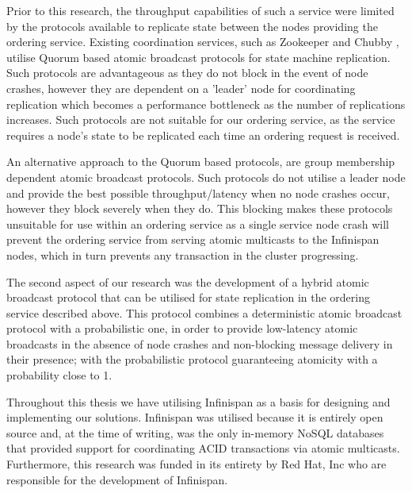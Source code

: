     Prior to this research, the throughput capabilities of such a service were limited by the protocols available to replicate state between the nodes providing the ordering service.  Existing coordination services, such as Zookeeper \citep{Hunt:2010:ZWC:1855840.1855851} and Chubby \citep{Burrows:2006:CLS:1298455.1298487}, utilise Quorum based atomic broadcast protocols for state machine replication.  Such protocols are advantageous as they do not block in the event of node crashes, however they are dependent on a 'leader' node for coordinating replication which becomes a performance bottleneck as the number of replications increases.  Such protocols are not suitable for our ordering service, as the service requires a node's state to be replicated each time an ordering request is received.  
    
    An alternative approach to the Quorum based protocols, are group membership dependent atomic broadcast protocols.  Such protocols do not utilise a leader node and provide the best possible throughput/latency when no node crashes occur, however they block severely when they do.  This blocking makes these protocols unsuitable for use within an ordering service as a single service node crash will prevent the ordering service from serving atomic multicasts to the Infinispan nodes, which in turn prevents any transaction in the cluster progressing.  

    The second aspect of our research was the development of a hybrid atomic broadcast protocol that can be utilised for state replication in the ordering service described above.  This protocol combines a deterministic atomic broadcast protocol with a probabilistic one, in order to provide low-latency atomic broadcasts in the absence of node crashes and non-blocking message delivery in their presence; with the probabilistic protocol guaranteeing atomicity with a probability close to 1.     
   
   Throughout this thesis we have utilising Infinispan as a basis for designing and implementing our solutions.  Infinispan was utilised because it is entirely open source and, at the time of writing, was the only in-memory NoSQL databases that provided support for coordinating ACID transactions via atomic multicasts.  Furthermore, this research was funded in its entirety by Red Hat, Inc who are responsible for the development of Infinispan.  